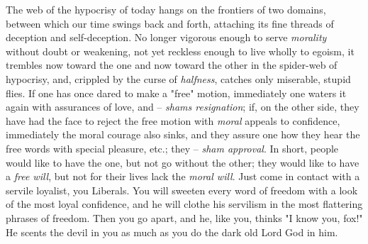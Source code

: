 The web of the hypocrisy of today hangs on the frontiers of two domains, 
between which our time swings back and forth, attaching its fine threads of 
deception and self-deception. No longer vigorous enough to serve 
\textit{morality} without doubt or weakening, not yet reckless enough to live 
wholly to egoism, it trembles now toward the one and now toward the other in 
the spider-web of hypocrisy, and, crippled by the curse of \textit{halfness}, 
catches only miserable, stupid flies. If one has once dared to make a 
"{}free"{} motion, immediately one waters it again with assurances of love, 
and -- \textit{shams resignation}; if, on the other side, they have had the 
face to reject the free motion with \textit{moral} appeals to confidence, 
immediately the moral courage also sinks, and they assure one how they hear 
the free words with special pleasure, etc.; they -- \textit{sham approval}. In 
short, people would like to have the one, but not go without the other; they 
would like to have a \textit{free will}, but not for their lives lack the 
\textit{moral will}. Just come in contact with a servile loyalist, you 
Liberals. You will sweeten every word of freedom with a look of the most loyal 
confidence, and he will clothe his servilism in the most flattering phrases of 
freedom. Then you go apart, and he, like you, thinks "{}I know you, fox!"{} He 
scents the devil in you as much as you do the dark old Lord God in him.

